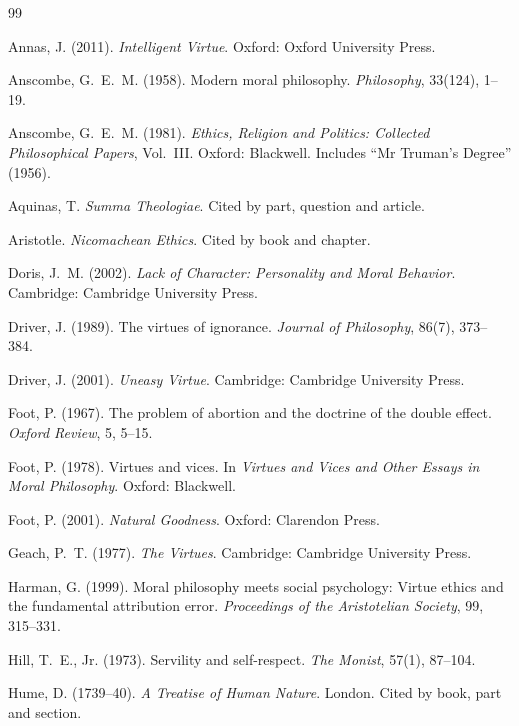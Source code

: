 \documentclass{situationist-preprint}
\begin{document}
\begin{thebibliography}{99}\small

 Annas, J. (2011). \emph{Intelligent Virtue}. Oxford: Oxford University Press.

 Anscombe, G.~E.~M. (1958). Modern moral philosophy. \emph{Philosophy}, 33(124), 1--19.

 Anscombe, G.~E.~M. (1981). \emph{Ethics, Religion and Politics: Collected Philosophical Papers}, Vol.~III. Oxford: Blackwell. Includes \enquote{Mr Truman's Degree} (1956).

 Aquinas, T. \emph{Summa Theologiae}. Cited by part, question and article.

 Aristotle. \emph{Nicomachean Ethics}. Cited by book and chapter.

 Doris, J.~M. (2002). \emph{Lack of Character: Personality and Moral Behavior}. Cambridge: Cambridge University Press.

 Driver, J. (1989). The virtues of ignorance. \emph{Journal of Philosophy}, 86(7), 373--384.

 Driver, J. (2001). \emph{Uneasy Virtue}. Cambridge: Cambridge University Press.

 Foot, P. (1967). The problem of abortion and the doctrine of the double effect. \emph{Oxford Review}, 5, 5--15.

 Foot, P. (1978). Virtues and vices. In \emph{Virtues and Vices and Other Essays in Moral Philosophy}. Oxford: Blackwell.

 Foot, P. (2001). \emph{Natural Goodness}. Oxford: Clarendon Press.

 Geach, P.~T. (1977). \emph{The Virtues}. Cambridge: Cambridge University Press.

 Harman, G. (1999). Moral philosophy meets social psychology: Virtue ethics and the fundamental attribution error. \emph{Proceedings of the Aristotelian Society}, 99, 315--331.

 Hill, T.~E., Jr. (1973). Servility and self-respect. \emph{The Monist}, 57(1), 87--104.

 Hume, D. (1739--40). \emph{A Treatise of Human Nature}. London. Cited by book, part and section.


\end{thebibliography}
\end{document}
